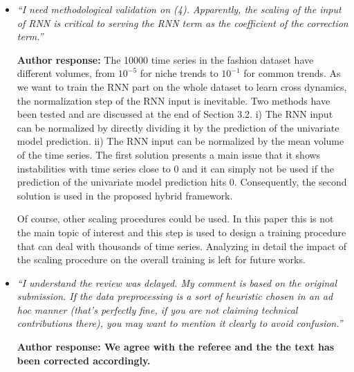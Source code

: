 \documentclass[10pt]{article} %
\begin{document}
\begin{itemize}
	\item {\em ``I need methodological validation on (4). Apparently, the scaling of the input of RNN is critical to serving the RNN term as the coefficient of the correction term.''} \medskip
	
	\textbf{Author response:} The 10000 time series in the fashion dataset have different volumes, from $10^{-5}$ for niche trends to $10^{-1}$ for common trends. As we want to train the RNN part on the whole dataset to learn cross dynamics, the normalization step of the RNN input is inevitable. Two methods have been tested and are discussed at the end of Section 3.2. i) The RNN input can be normalized by directly dividing it by the prediction of the univariate model prediction. ii) The RNN input can be normalized by the mean volume of the time series. The first solution presents a main issue that it shows instabilities with time series close to 0 and it can simply not be used if the prediction of the univariate model prediction hits 0. Consequently, the second solution is used in the proposed hybrid framework. 

Of course, other scaling procedures could be used. In this paper this is not the main topic of interest and this step is used to design a training procedure that can deal with thousands of time series. Analyzing in detail the impact of the scaling procedure on the overall training is left for future works.\\


	\item {\em ``I understand the review was delayed. My comment is based on the original submission. If the data preprocessing is a sort of heuristic chosen in an ad hoc manner (that's perfectly fine, if you are not claiming technical contributions there), you may want to mention it clearly to avoid confusion.''} \medskip

	\textbf{Author response: We agree with the referee and the  the text has been corrected accordingly.}

\end{itemize}
\end{document}
